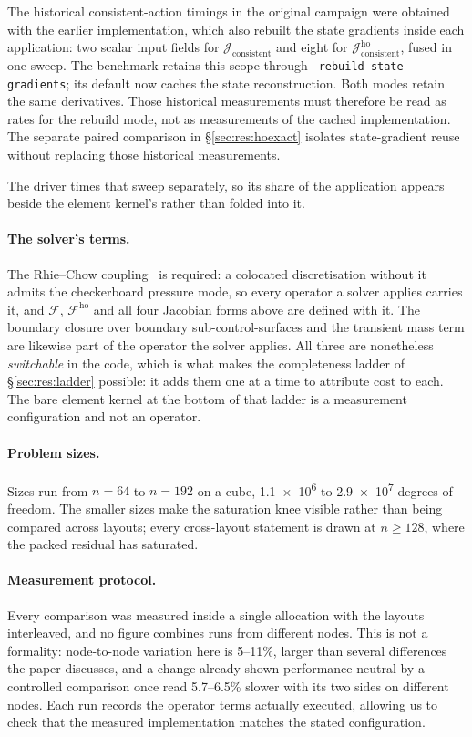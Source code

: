 \documentclass[sigconf,nonacm]{acmart}
\newcommand{\Fres}{\mathcal{F}}
\newcommand{\Fho}{\mathcal{F}^{\mathrm{ho}}}
\newcommand{\Jex}{\mathcal{J}_{\mathrm{consistent}}}
\newcommand{\Jhoex}{\mathcal{J}^{\mathrm{ho}}_{\mathrm{consistent}}}
\begin{document}
The historical consistent-action timings in the original campaign were obtained with the
earlier implementation, which also rebuilt the state gradients inside each application:
two scalar input fields for $\Jex$ and eight for $\Jhoex$, fused in one sweep. The benchmark
retains this scope through \texttt{--rebuild-state-gradients}; its default now caches the
state reconstruction. Both modes retain the same derivatives. Those historical measurements
must therefore be read as rates for the rebuild mode, not as measurements of the cached
implementation. The separate paired comparison in \S\ref{sec:res:hoexact} isolates
state-gradient reuse without replacing those historical measurements.

The driver times that sweep separately, so its share of the application appears beside the
element kernel's rather than folded into it.

\paragraph{The solver's terms.} The Rhie--Chow coupling~\cite{RhieChow1983} is required: a
colocated discretisation without it admits the checkerboard pressure mode, so every operator a
solver applies carries it, and $\Fres$, $\Fho$ and all four Jacobian forms above are defined with
it. The boundary closure over boundary sub-control-surfaces and the transient mass term are
likewise part of the operator the solver applies. All three are nonetheless \emph{switchable} in
the code, which is what makes the completeness ladder of \S\ref{sec:res:ladder} possible: it adds
them one at a time to attribute cost to each. The bare element kernel at the bottom of that
ladder is a measurement configuration and not an operator.

\paragraph{Problem sizes.} Sizes run from $n=64$ to $n=192$ on a cube, \SI{1.1e6}{} to
\SI{2.9e7}{} degrees of freedom. The smaller sizes make the saturation knee visible rather than
being compared across layouts; every cross-layout statement is drawn at $n\ge128$, where the
packed residual has saturated.

\paragraph{Measurement protocol.} Every comparison was measured inside a single allocation with
the layouts interleaved, and no figure combines runs from different nodes. This is not a
formality: node-to-node variation here is 5--11\%, larger than several differences the paper
discusses, and a change already shown performance-neutral by a controlled comparison once read
5.7--6.5\% slower with its two sides on different nodes. Each run records the operator terms actually executed, allowing us to check
that the measured implementation matches the stated configuration.
\end{document}

